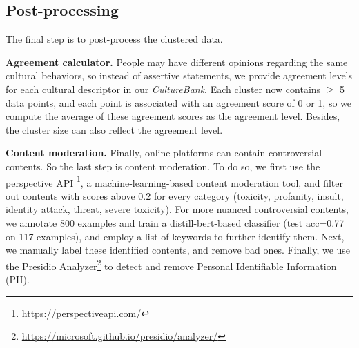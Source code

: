 \documentclass{article} %
\newcommand{\ryan}[1]{\textcolor{magenta}{[#1 --Ryan]}}
\newcommand{\dataname}{\textit{CultureBank}\xspace}
\begin{document}




\vspace{-1em}
\subsection{Post-processing}
\label{pipeline:post-processing}

The final step is to post-process the clustered data. 

\noindent\textbf{Agreement calculator.} 
People may have different opinions regarding the same cultural behaviors, so instead of assertive statements, we provide agreement levels for each cultural descriptor in our \dataname. Each cluster now contains $\geq$ 5 data points, and each point is associated with an agreement score of 0 or 1, so we compute the average of these agreement scores as the agreement level. %
Besides, the cluster size can also reflect the agreement level. 


\noindent\textbf{Content moderation.} 
Finally, online platforms can contain controversial contents.  
So the last step is content moderation. To do so, we first use the perspective API \footnote{\url{https://perspectiveapi.com/}}, a machine-learning-based content moderation tool,  and filter out contents with scores above 0.2 for every category (toxicity, profanity, insult, identity attack, threat, severe toxicity). For more nuanced controversial contents, we annotate 800 examples and train a distill-bert-based classifier (test acc=0.77 on 117 examples), and employ a list of keywords to further identify them. Next, we manually label these identified contents, and remove bad ones. %
Finally, we use the Presidio Analyzer\footnote{\url{https://microsoft.github.io/presidio/analyzer/}} to detect and remove Personal Identifiable Information (PII). %



\vspace{-1em}
\end{document}
